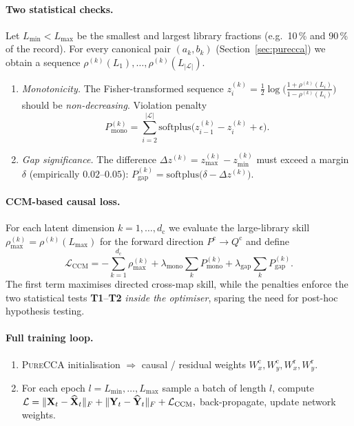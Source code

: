\documentclass[14pt]{extarticle}
\begin{document}
	\paragraph{Two statistical checks.}
	Let
	$L_{\min}\!<\!L_{\max}$ be the smallest and largest library
	fractions (e.g.\ 10\,\% and 90\,\% of the record).
	For every canonical pair $(a_k,b_k)$ (Section~\ref{sec:purecca}) we
	obtain a sequence
	$\rho^{(k)}(L_1),\dots,\rho^{(k)}(L_{|\mathcal L|})$.
	
	\begin{enumerate}[label=\textbf{T\arabic*}),leftmargin=1.5em,noitemsep]
		\item \textit{Monotonicity.}  
		The Fisher-transformed sequence
		$z^{(k)}_i=\tfrac12\log\!\bigl(\tfrac{1+\rho^{(k)}(L_i)}
		{1-\rho^{(k)}(L_i)}\bigr)$
		should be \emph{non-decreasing}.  Violation penalty
		\[
		P^{(k)}_{\text{mono}}
		= \sum_{i=2}^{|\mathcal L|}
		\mathrm{softplus}\!\bigl(z^{(k)}_{i-1}-z^{(k)}_{i}+\epsilon\bigr).
		\]
		\item \textit{Gap significance.}  
		The difference
		$\Delta z^{(k)} = z^{(k)}_{\max}-z^{(k)}_{\min}$ must exceed a margin
		$\delta$ (empirically $0.02$–$0.05$):
		$
		P^{(k)}_{\text{gap}}
		= \mathrm{softplus}\!\bigl(\delta-\Delta z^{(k)}\bigr).
		$
	\end{enumerate}
	
	\paragraph{CCM-based causal loss.}
	For each latent dimension $k\!=\!1,\dots,d_{\mathrm c}$ we evaluate the
	large-library skill
	$\rho^{(k)}_{\max}\!=\!\rho^{(k)}(L_{\max})$ for the forward direction
	$P^{\mathrm c}\!\to\!Q^{\mathrm c}$ and define
	\[
	\mathcal L_{\text{CCM}}
	= -\sum_{k=1}^{d_{\mathrm c}}\rho^{(k)}_{\max}
	+ \lambda_{\text{mono}}\sum_{k}P^{(k)}_{\text{mono}}
	+ \lambda_{\text{gap}}\sum_{k}P^{(k)}_{\text{gap}}.
	\]
	The first term maximises directed cross-map skill,
	while the penalties enforce the two statistical tests \textbf{T1}–\textbf{T2}
	\emph{inside the optimiser}, sparing the need for post-hoc
	hypothesis testing.
	
	\paragraph{Full training loop.}
	\begin{enumerate}[leftmargin=1.5em,noitemsep]
		\item \textsc{PureCCA} initialisation  
		$\Rightarrow$ causal / residual weights
		$W_x^{\mathrm c},W_y^{\mathrm c},W_x^{\mathrm r},W_y^{\mathrm r}$.
		\item For each epoch $l=L_{\min},\dots,L_{\max}$  
		sample a batch of length $l$, compute
		\(
		\mathcal L
		=\|\mathbf{X}_t-\widehat{\mathbf{X}}_t\|_F
		+\|\mathbf{Y}_t-\widehat{\mathbf{Y}}_t\|_F
		+\mathcal L_{\text{CCM}},
		\)
		back-propagate, update network weights.
	\end{enumerate}
	
\end{document}
